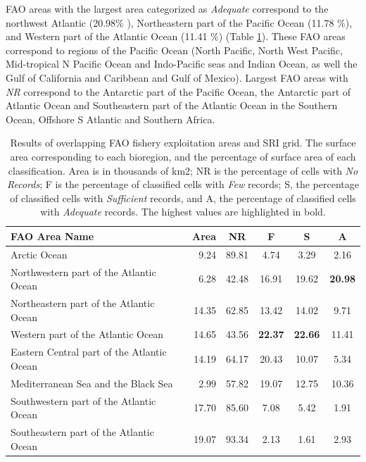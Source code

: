 \documentclass[12pt,authoryear]{elsarticle}
\begin{document}
FAO areas with the largest area categorized as \textit{Adequate} correspond to the northwest Atlantic (20.98\% ), Northeastern part of the Pacific Ocean (11.78 \%), and Western part of the Atlantic Ocean (11.41 \%) (Table \ref{tab:FAO}). These FAO areas correspond to regions of the Pacific Ocean (North Pacific, North West Pacific, Mid-tropical N Pacific Ocean and Indo-Pacific seas and Indian Ocean, as well the Gulf of California and Caribbean and Gulf of Mexico). Largest FAO areas with \textit{NR} correspond to the Antarctic part of the Pacific Ocean, the Antarctic part of Atlantic Ocean and Southeastern part of the Atlantic Ocean in the Southern Ocean, Offshore S Atlantic and Southern Africa. 

\begin{table}[h]
    \centering
\caption{Results of overlapping FAO fishery exploitation areas and SRI grid. The surface area corresponding to each bioregion, and the percentage of surface area of each classification. Area is in thousands of km2; NR is the percentage of cells with \textit{No Records}; F is the percentage of classified cells with \textit{Few} records; S, the percentage of classified cells with \textit{Sufficient} records, and A, the percentage of classified cells with \textit{Adequate} records. The highest values are highlighted in bold.
}
\label{tab:FAO}
\begin{tabular}{| l | r | c | c  | c | c |}
 \hline
FAO Area Name & Area & NR & F & S & A \\ 
  \hline
Arctic Ocean                               &  9.24 & 89.81 &  4.74 &  3.29 &  2.16 \\ 
Northwestern part of the Atlantic Ocean    &  6.28 & 42.48 & 16.91 & 19.62 & \textbf{20.98} \\ 
Northeastern part of the Atlantic Ocean    & 14.35 & 62.85 & 13.42 & 14.02 &  9.71 \\ 
Western part of the Atlantic Ocean         & 14.65 & 43.56 & \textbf{22.37} & \textbf{22.66} & 11.41 \\ 
Eastern Central part of the Atlantic Ocean & 14.19 & 64.17 & 20.43 & 10.07 &  5.34 \\ 
Mediterranean Sea and the Black Sea        &  2.99 & 57.82 & 19.07 & 12.75 & 10.36 \\ 
Southwestern part of the Atlantic Ocean    & 17.70 & 85.60 &  7.08 &  5.42 &  1.91 \\ 
Southeastern part of the Atlantic Ocean    & 19.07 & 93.34 &  2.13 &  1.61 &  2.93 \\ 

\end{tabular}
\end{table}
\end{document}
